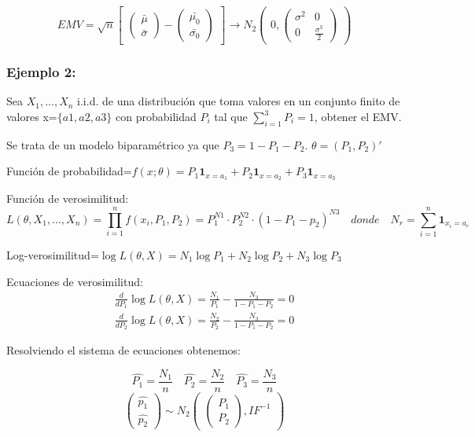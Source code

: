\[ EMV=\sqrt{n}
\begin{bmatrix}
    \begin{pmatrix}
        \bar{\mu}\\
        \bar{\sigma}
    \end{pmatrix}
    -
    \begin{pmatrix}
        \bar{\mu_0}\\
        \bar{\sigma_0}
    \end{pmatrix}
\end{bmatrix}
\to
N_2
\begin{pmatrix}
    0,
    \begin{pmatrix}
        \sigma^2 & 0\\
        0 & \frac{\sigma^3}{2}
    \end{pmatrix}
        
    \end{pmatrix}
\]

\subsubsection*{Ejemplo 2:}
Sea $X_1,\dots,X_n$ i.i.d. de una distribución que toma valores en un conjunto finito de valores x=$\{a1,a2,a3\}$ con probabilidad
$P_i$ tal que $\sum_{i=1}^{3} P_i=1$, obtener el EMV.

Se trata de un modelo biparamétrico ya que $P_3=1-P_1-P_2$. $\theta=(P_1,P_2)'$

Función de probabilidad=$f(x; \theta) = P_1 \mathbf{1}_{x = a_1} + P_2 \mathbf{1}_{x = a_2} + P_3 \mathbf{1}_{x = a_3}$

Función de verosimilitud:
\[L(\theta,X_1,\dots,X_n)=\prod_{i=1}^{n}f(x_i,P_1,P_2)=P_1^{N1}\cdot P_2^{N2} \cdot (1-P_1-p_2)^{N3}
\quad donde \quad N_r=\sum_{i=1}^{n} \mathbf{1}_{x_i=a_r}
\]

Log-verosimilitud=$ \log L(\theta,X)=N_1 \log P_1 + N_2 \log P_2 +N_3 \log P_3$

Ecuaciones de verosimilitud:
\[
\begin{matrix}
    \frac{d}{dP_1} \log L(\theta,X)=\frac{N_1}{P_1}-\frac{N_3}{1-P_1-P_2}=0
    \\ \frac{d}{dP_2} \log L(\theta,X)=\frac{N_2}{P_2}-\frac{N_3}{1-P_1-P_2}=0
    
\end{matrix}
\]

Resolviendo el sistema de ecuaciones obtenemos:

\[
\hat{P_1}=\frac{N_1}{n} \quad \hat{P_2}=\frac{N_2}{n} \quad \hat{P_3}=\frac{N_3}{n}
\]
\[
\begin{pmatrix}
    \hat{p_1} \\
    \hat{p_2}
\end{pmatrix}
\sim
N_2
\begin{pmatrix}
    \begin{pmatrix}
        P_1 \\
        P_2
    \end{pmatrix}
, IF^{-1}
\end{pmatrix}
\]

